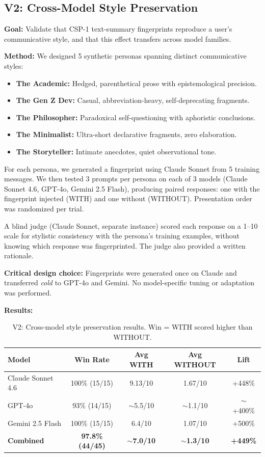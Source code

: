 \documentclass[11pt,a4paper]{article}
\begin{document}
\subsection{V2: Cross-Model Style Preservation}
\label{sec:v2}

\textbf{Goal:} Validate that CSP-1 text-summary fingerprints reproduce a user's communicative style, and that this effect transfers across model families.

\textbf{Method:} We designed 5 synthetic personas spanning distinct communicative styles:

\begin{itemize}[nosep]
  \item \textbf{The Academic:} Hedged, parenthetical prose with epistemological precision.
  \item \textbf{The Gen Z Dev:} Casual, abbreviation-heavy, self-deprecating fragments.
  \item \textbf{The Philosopher:} Paradoxical self-questioning with aphoristic conclusions.
  \item \textbf{The Minimalist:} Ultra-short declarative fragments, zero elaboration.
  \item \textbf{The Storyteller:} Intimate anecdotes, quiet observational tone.
\end{itemize}

For each persona, we generated a fingerprint using Claude Sonnet from 5 training messages. We then tested 3 prompts per persona on each of 3 models (Claude Sonnet 4.6, GPT-4o, Gemini 2.5 Flash), producing paired responses: one with the fingerprint injected (WITH) and one without (WITHOUT). Presentation order was randomized per trial.

A blind judge (Claude Sonnet, separate instance) scored each response on a 1--10 scale for stylistic consistency with the persona's training examples, without knowing which response was fingerprinted. The judge also provided a written rationale.

\textbf{Critical design choice:} Fingerprints were generated once on Claude and transferred \textit{cold} to GPT-4o and Gemini. No model-specific tuning or adaptation was performed.

\textbf{Results:}

\begin{table}[h]
\centering
\caption{V2: Cross-model style preservation results. Win = WITH scored higher than WITHOUT.}
\label{tab:v2}
\begin{tabular}{lcccc}
\toprule
\textbf{Model} & \textbf{Win Rate} & \textbf{Avg WITH} & \textbf{Avg WITHOUT} & \textbf{Lift} \\
\midrule
Claude Sonnet 4.6 & 100\% (15/15) & 9.13/10 & 1.67/10 & +448\% \\
GPT-4o            & 93\% (14/15)  & $\sim$5.5/10 & $\sim$1.1/10 & $\sim$+400\% \\
Gemini 2.5 Flash  & 100\% (15/15) & 6.4/10  & 1.07/10 & +500\% \\
\midrule
\textbf{Combined} & \textbf{97.8\% (44/45)} & \textbf{$\sim$7.0/10} & \textbf{$\sim$1.3/10} & \textbf{+449\%} \\
\bottomrule
\end{tabular}
\end{table}
\end{document}
